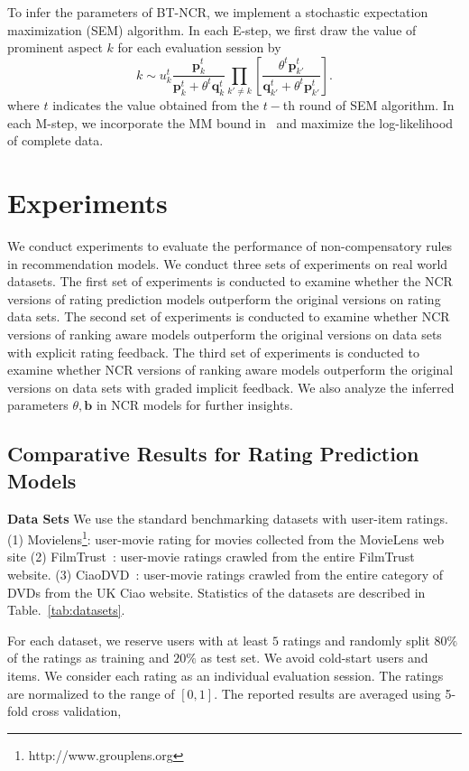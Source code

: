 \documentclass[letterpaper]{article} %
\begin{document}
To infer the parameters of BT-NCR, we implement a stochastic expectation maximization (SEM) algorithm. In each E-step, we first draw the value of prominent aspect $k$ for each evaluation session by
 \begin{equation}
 k \sim u_k^{t} \frac{\mathbf{p}_{k}^t} {\mathbf{p}_{k}^t+\theta^t \mathbf{q}_{k}^t} \prod_{k'\neq k}  [\frac{\theta^t \mathbf{p}_{k'}^t} {\mathbf{q}_{k'}^t + \theta^t \mathbf{p}_{k'}^t}].
 \end{equation}
 where $t$ indicates the value obtained from the $t-$th round of SEM algorithm.
 In each M-step, we incorporate the MM bound in~\cite{Hunter2004MM} and maximize the log-likelihood of complete data. 




\section{Experiments}\label{sec:experiment}
We conduct experiments to evaluate the performance of non-compensatory rules in recommendation models. We conduct three sets of experiments on real world datasets. The first set of experiments is conducted to examine whether the NCR versions of rating prediction models outperform the original versions on rating data sets. 
The second set of experiments is conducted to examine whether NCR versions of ranking aware models outperform the original versions on data sets with explicit rating feedback.
The third set of experiments is conducted to examine whether NCR versions of ranking aware models outperform the original versions on data sets with graded implicit feedback. We also analyze the inferred parameters $\theta,\mathbf{b}$ in NCR models for further insights.

\subsection{Comparative Results for Rating Prediction Models}

\textbf{Data Sets} We use the standard benchmarking datasets with user-item ratings. (1) Movielens\footnote{http://www.grouplens.org}: user-movie rating for movies collected from the MovieLens web site (2) FilmTrust~\cite{Guo2013Novel}: user-movie ratings crawled from the entire FilmTrust website. (3) CiaoDVD~\cite{Guo2014ETAF}: user-movie ratings crawled from the entire category of DVDs from the UK Ciao website. Statistics of the datasets are described in Table.~\ref{tab:datasets}. 

For each dataset, we reserve users with at least $5$ ratings and randomly split $80\%$ of the ratings as training and $20\%$ as test set. We avoid cold-start users and items. We consider each rating as an individual evaluation session. The ratings are normalized to the range of $[0,1]$. The reported results are averaged using 5-fold cross validation, 
\end{document}

